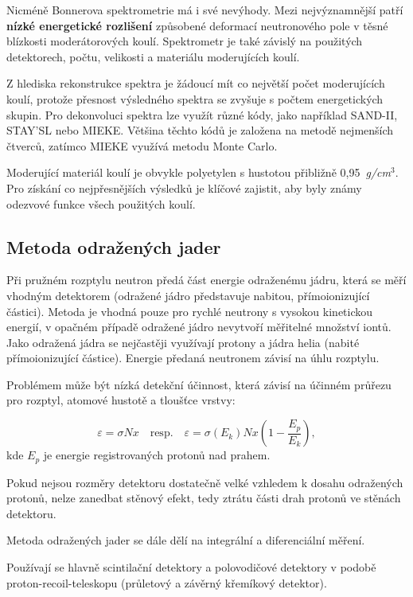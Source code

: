 Nicméně Bonnerova spektrometrie má i své nevýhody. Mezi nejvýznamnější patří \textbf{nízké energetické rozlišení} způsobené deformací neutronového pole v těsné blízkosti moderátorových koulí. Spektrometr je také závislý na použitých detektorech, počtu, velikosti a materiálu moderujících koulí.

Z hlediska rekonstrukce spektra je žádoucí mít co největší počet moderujících koulí, protože přesnost výsledného spektra se zvyšuje s počtem energetických skupin. Pro dekonvoluci spektra lze využít různé kódy, jako například SAND-II, STAY'SL nebo MIEKE. Většina těchto kódů je založena na metodě nejmenších čtverců, zatímco MIEKE využívá metodu Monte Carlo.

Moderující materiál koulí je obvykle polyetylen s hustotou přibližně 0,95~\textit{g/cm}$^3$. Pro získání co nejpřesnějších výsledků je klíčové zajistit, aby byly známy odezvové funkce všech použitých koulí.

\subsection{Metoda odražených jader}

Při pružném rozptylu neutron předá část energie odraženému jádru, která se měří vhodným detektorem (odražené jádro představuje nabitou, přímoionizující částici). Metoda je vhodná pouze pro rychlé neutrony s vysokou kinetickou energií, v opačném případě odražené jádro nevytvoří měřitelné množství iontů. Jako odražená jádra se nejčastěji využívají protony a jádra helia (nabité přímoionizující částice). Energie předaná neutronem závisí na úhlu rozptylu.

Problémem může být nízká detekční účinnost, která závisí na účinném průřezu pro rozptyl, atomové hustotě a tloušťce vrstvy:

\begin{equation}
    \varepsilon = \sigma N x \quad \text{resp.} \quad \varepsilon = \sigma(E_k) N x \left( 1 - \frac{E_p}{E_k} \right),
\end{equation}
kde $E_p$ je energie registrovaných protonů nad prahem.

Pokud nejsou rozměry detektoru dostatečně velké vzhledem k dosahu odražených protonů, nelze zanedbat stěnový efekt, tedy ztrátu části drah protonů ve stěnách detektoru.

Metoda odražených jader se dále dělí na integrální a diferenciální měření.

Používají se hlavně scintilační detektory a polovodičové detektory v podobě proton-recoil-teleskopu (průletový a závěrný křemíkový detektor).

